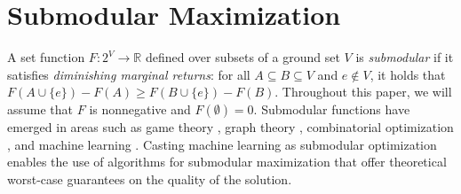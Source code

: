 \documentclass{article} %
\newcommand{\union}{\cup}
\begin{document}
\section{Submodular Maximization \label{sec:submodularmax}}
A set function $F: 2^V \to \mathbb{R}$ defined over subsets of a ground set $V$ is \emph{submodular} if it satisfies \emph{diminishing marginal returns}: for all $A \subseteq B \subseteq V$ and  $e \notin V$, it holds that $F(A \union \{e\}) - F(A) \geq F(B \union \{e\}) - F(B)$. Throughout this paper, we will assume that $F$ is nonnegative and $F(\emptyset)=0$.
Submodular functions have emerged in areas such as game theory \cite{shapley71}, graph theory \cite{frank93}, combinatorial optimization \cite{schrijver02}, %
and machine learning \cite{tutorial,tutorial2}.
Casting machine learning as submodular optimization enables the use of algorithms for submodular maximization \cite{buchbinder2012,nemhauser1978} that offer theoretical worst-case guarantees on the quality of the solution.
\end{document}
